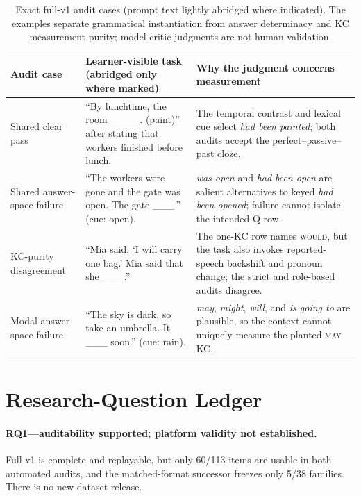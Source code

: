 \makeatletter
\setlength{\@dblfptop}{0pt}
\makeatother
\begin{table}[!t]
  \centering
  \footnotesize
  \begin{tabularx}{\textwidth}{@{}p{}p{}p{}@{}}
    \toprule
    Audit case & Learner-visible task (abridged only where marked) & Why the
      judgment concerns measurement \\
    \midrule
    Shared clear pass & ``By lunchtime, the room \_\_\_\_. (paint)'' after
      stating that workers finished before lunch. & The temporal contrast and
      lexical cue select \emph{had been painted}; both audits accept the
      perfect--passive--past cloze. \\
    Shared answer-space failure & ``The workers were gone and the gate was
      open.  The gate \_\_\_.'' (cue: open). & \emph{was open} and
      \emph{had been open} are salient alternatives to keyed
      \emph{had been opened}; failure cannot isolate the intended Q row. \\
    KC-purity disagreement & ``Mia said, `I will carry one bag.'  Mia said
      that she \_\_\_.'' & The one-KC row names \textsc{would}, but the task
      also invokes reported-speech backshift and pronoun change; the strict and
      role-based audits disagree. \\
    Modal answer-space failure & ``The sky is dark, so take an umbrella.  It
      \_\_\_ soon.'' (cue: rain). & \emph{may}, \emph{might}, \emph{will},
      and \emph{is going to} are plausible, so the context cannot uniquely
      measure the planted \textsc{may} KC. \\
    \bottomrule
  \end{tabularx}
  \caption{Exact full-v1 audit cases (prompt text lightly abridged where
  indicated).  The examples separate grammatical instantiation from answer
  determinacy and KC measurement purity; model-critic judgments are not human
  validation.}
  \label{tab:item-audit-examples}
\end{table}

\section{Research-Question Ledger}

\paragraph{RQ1---auditability supported; platform validity not established.}
Full-v1 is complete and replayable, but only 60/113 items are usable in both
automated audits, and the matched-format successor freezes only 5/38 families.
There is no new dataset release.

